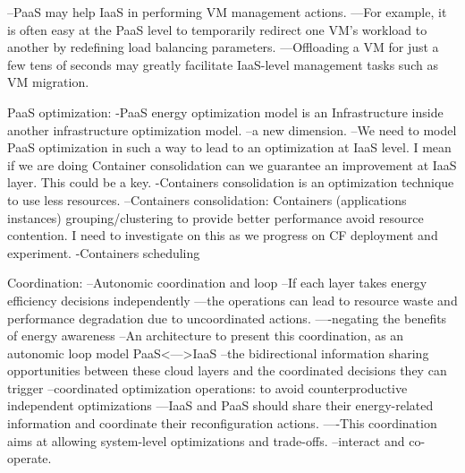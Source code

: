 --PaaS may help IaaS in performing VM management actions.
---For example, it is often easy at the PaaS level to temporarily redirect one VM’s workload to another by redefining load balancing parameters.
---Offloading a VM for just a few tens of seconds may greatly facilitate IaaS-level management tasks such as VM migration.

PaaS optimization:
-PaaS energy optimization model is an Infrastructure inside another infrastructure optimization model. 
--a new dimension.
--We need to model PaaS optimization in such a way to lead to an optimization at IaaS level. I mean if we are doing Container consolidation can we guarantee an improvement at IaaS layer. This could be a key.
-Containers consolidation is an optimization technique to use less resources.
--Containers consolidation: Containers (applications instances) grouping/clustering to provide better performance avoid resource contention. I need to investigate on this as we progress on CF deployment and experiment.
-Containers scheduling

Coordination:
--Autonomic coordination and loop
--If each layer takes energy efficiency decisions independently
---the operations can lead to resource waste and performance degradation due to uncoordinated actions.
----negating the benefits of energy awareness
--An architecture to present this coordination, as an autonomic loop model PaaS<--->IaaS
--the bidirectional information sharing opportunities between these cloud layers and the coordinated decisions they can trigger
--coordinated optimization operations: to avoid counterproductive independent optimizations
---IaaS and PaaS should share their energy-related information and coordinate their reconfiguration actions. 
----This coordination aims at allowing system-level optimizations and trade-offs.
--interact and co-operate.

